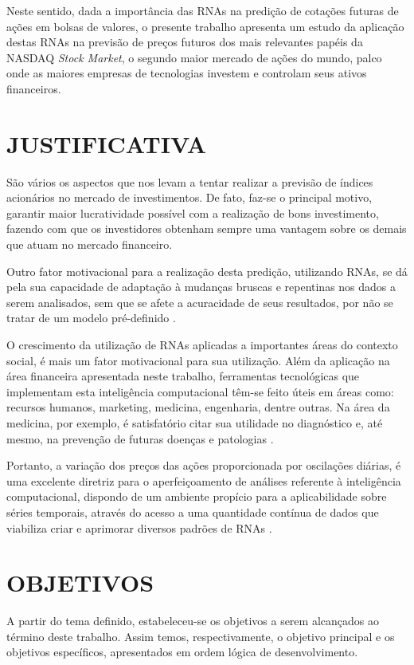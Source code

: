 Neste sentido, dada a importância das RNAs na predição de cotações futuras de ações em bolsas de valores, o presente trabalho apresenta um estudo da aplicação destas RNAs na previsão de preços futuros dos mais relevantes papéis da NASDAQ \textit{Stock Market}, o segundo maior mercado de ações do mundo, palco onde as maiores empresas de tecnologias investem e controlam seus ativos financeiros.


\section{JUSTIFICATIVA}\label{sec:justificativa}

São vários os aspectos que nos levam a tentar realizar a previsão de índices acionários no mercado de investimentos. De fato, faz-se o principal motivo, garantir maior lucratividade possível com a realização de bons investimento, fazendo com que os investidores obtenham sempre uma vantagem sobre os demais que atuam no mercado financeiro.

Outro fator motivacional para a realização desta predição, utilizando RNAs, se dá pela sua capacidade de adaptação à mudanças bruscas e repentinas nos dados a serem analisados, sem que se afete a acuracidade de seus resultados, por não se tratar de um modelo pré-definido \cite{marangoni}.

O crescimento da utilização de RNAs aplicadas a importantes áreas do contexto social, é mais um fator motivacional para sua utilização. Além da aplicação na área financeira apresentada neste trabalho, ferramentas tecnológicas que implementam esta inteligência computacional têm-se feito úteis em áreas como: recursos humanos, marketing, medicina, engenharia, dentre outras. Na área da medicina, por exemplo, é satisfatório citar sua utilidade no diagnóstico e, até mesmo, na prevenção de futuras doenças e patologias \cite{marangoni}.

Portanto, a variação dos preços das ações proporcionada por oscilações diárias, é uma excelente diretriz para o aperfeiçoamento de análises referente à inteligência computacional, dispondo de um ambiente propício para a aplicabilidade sobre séries temporais, através do acesso a uma quantidade contínua de dados que viabiliza criar e aprimorar diversos padrões de RNAs \cite{gambogi}.



\section{OBJETIVOS}\label{sec:objetivos}
A partir do tema definido, estabeleceu-se os objetivos a serem alcançados ao término deste trabalho. Assim temos, respectivamente, o objetivo principal e os objetivos específicos, apresentados em ordem lógica de desenvolvimento.
